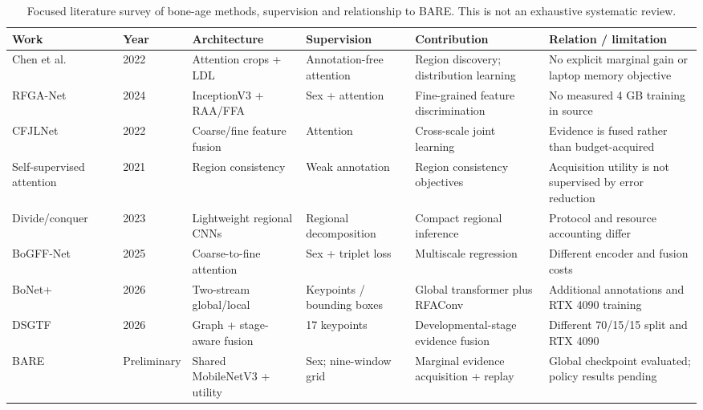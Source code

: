 \begin{table}[!t]
\centering\footnotesize
\caption{Focused literature survey of bone-age methods, supervision and relationship to BARE. This is not an exhaustive systematic review.}
\label{tab:prelim_literature}
\begin{tabularx}{\textwidth}{@{}p{31mm}XXXXX@{}}
\toprule
Work & Year & Architecture & Supervision & Contribution & Relation / limitation \\
\midrule
Chen et al.~\cite{chen} & 2022 & Attention crops + LDL & Annotation-free attention & Region discovery; distribution learning & No explicit marginal gain or laptop memory objective \\
RFGA-Net~\cite{rfga} & 2024 & InceptionV3 + RAA/FFA & Sex + attention & Fine-grained feature discrimination & No measured 4 GB training in source \\
CFJLNet~\cite{cfjl} & 2022 & Coarse/fine feature fusion & Attention & Cross-scale joint learning & Evidence is fused rather than budget-acquired \\
Self-supervised attention~\cite{selfsupervised} & 2021 & Region consistency & Weak annotation & Region consistency objectives & Acquisition utility is not supervised by error reduction \\
Divide/conquer~\cite{lightweight} & 2023 & Lightweight regional CNNs & Regional decomposition & Compact regional inference & Protocol and resource accounting differ \\
BoGFF-Net~\cite{bogff} & 2025 & Coarse-to-fine attention & Sex + triplet loss & Multiscale regression & Different encoder and fusion costs \\
BoNet+~\cite{bonetplus} & 2026 & Two-stream global/local & Keypoints / bounding boxes & Global transformer plus RFAConv & Additional annotations and RTX 4090 training \\
DSGTF~\cite{stage} & 2026 & Graph + stage-aware fusion & 17 keypoints & Developmental-stage evidence fusion & Different 70/15/15 split and RTX 4090 \\
BARE & Preliminary & Shared MobileNetV3 + utility & Sex; nine-window grid & Marginal evidence acquisition + replay & Global checkpoint evaluated; policy results pending \\
\bottomrule
\end{tabularx}
\end{table}